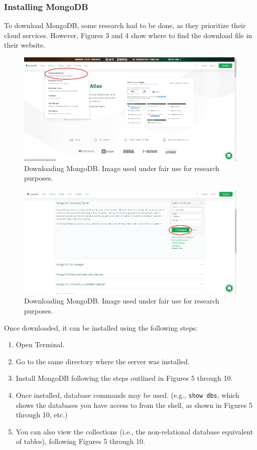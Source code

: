 \documentclass[titlepage, 12pt]{article}
\begin{document}
\subsubsection{Installing MongoDB}

To download MongoDB, some research had to be done, as they prioritize their cloud services. However, Figures 3 and 4 show where to find the download file in their website.

\begin{figure}[h]
    \centering\includegraphics[width=0.75\linewidth]{images/mongodb-website-1.png}
    \caption{Downloading MongoDB. Image used under fair use for research purposes.}
\end{figure}

\begin{figure}[h]
    \centering\includegraphics[width=0.75\linewidth]{images/mongodb-website-2.png}
    \caption{Downloading MongoDB. Image used under fair use for research purposes.}
\end{figure}

Once downloaded, it can be installed using the following steps:

\begin{enumerate}
    \item Open Terminal.
    \item Go to the same directory where the server was installed.
    \item Install MongoDB following the steps outlined in Figures 5 through 10.
    \item Once installed, database commands may be used. (e.g., \texttt{show dbs}, which shows the databases you have access to from the shell, as shown in Figures 5 through 10, etc.)
    \item You can also view the collections (i.e., the non-relational database equivalent of tables), following Figures 5 through 10.
\end{enumerate}
\end{document}
